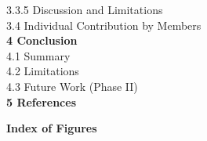 \documentclass[12pt,a4paper]{article}
\begin{document}
\hspace*{1.2cm} 3.3.5 \hspace{0.2cm} Discussion and Limitations  \\
\hspace*{0.6cm} 3.4 \hspace{0.2cm} Individual Contribution by Members  \\
\textbf{4 \hspace{0.2cm} Conclusion } \\
\hspace*{0.6cm} 4.1 \hspace{0.2cm} Summary  \\
\hspace*{0.6cm} 4.2 \hspace{0.2cm} Limitations  \\
\hspace*{0.6cm} 4.3 \hspace{0.2cm} Future Work (Phase II)  \\
\textbf{5 \hspace{0.2cm} References }

\newpage
\thispagestyle{fancy}
\begin{center}
    {\fontsize{13pt}{15pt}\bfseries Index of Figures \par}
\end{center}
\vspace{0.3cm}
\end{document}
